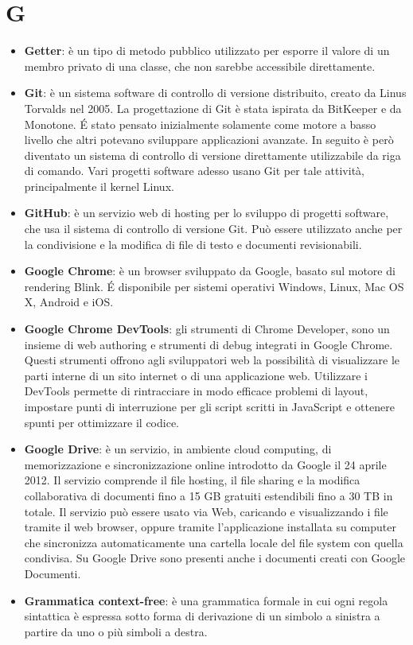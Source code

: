 \section{G}
\begin{itemize}
	\item
	\textbf{Getter}: è un tipo di metodo pubblico utilizzato per esporre il valore di un membro privato di una classe, che non sarebbe accessibile direttamente. 
	\item
	\textbf{Git}: è un sistema software di controllo di versione distribuito, creato da Linus Torvalds nel 2005.
	La progettazione di Git è stata ispirata da BitKeeper e da Monotone. \'E stato pensato inizialmente solamente come motore a basso livello che altri potevano sviluppare applicazioni avanzate. In seguito è però diventato un sistema di controllo di versione direttamente utilizzabile da riga di comando. Vari progetti software adesso usano Git per tale attività, principalmente il kernel Linux.
	\item
	\textbf{GitHub}: è un servizio web di hosting per lo sviluppo di progetti software, che usa il sistema di controllo di versione Git. Può essere utilizzato anche per la condivisione e la modifica di file di testo e documenti revisionabili. 
	\item
	\textbf{Google Chrome}: è un browser sviluppato da Google, basato sul motore di rendering Blink. \'E disponibile per sistemi operativi Windows, Linux, Mac OS X, Android e iOS. 
	\item
	\textbf{Google Chrome DevTools}: gli strumenti di Chrome Developer, sono un insieme di web authoring e strumenti di debug integrati in Google Chrome. Questi strumenti offrono agli sviluppatori web la possibilità di visualizzare le parti interne di un sito internet o di una applicazione web. Utilizzare i DevTools permette di rintracciare in modo efficace problemi di layout, impostare punti di interruzione per gli script scritti in JavaScript e ottenere spunti per ottimizzare il codice.
	\item
	\textbf{Google Drive}: è un servizio, in ambiente cloud computing, di memorizzazione e sincronizzazione online introdotto da Google il 24 aprile 2012. Il servizio comprende il file hosting, il file sharing e la modifica collaborativa di documenti fino a 15 GB gratuiti estendibili fino a 30 TB in totale. Il servizio può essere usato via Web, caricando e visualizzando i file tramite il web browser, oppure tramite l'applicazione installata su computer che sincronizza automaticamente una cartella locale del file system con quella condivisa. Su Google Drive sono presenti anche i documenti creati con Google Documenti.
	\item
	\textbf{Grammatica context-free}: è una grammatica formale in cui ogni regola sintattica è espressa sotto forma di derivazione di un simbolo a sinistra a partire da uno o più simboli a destra.
\end{itemize}